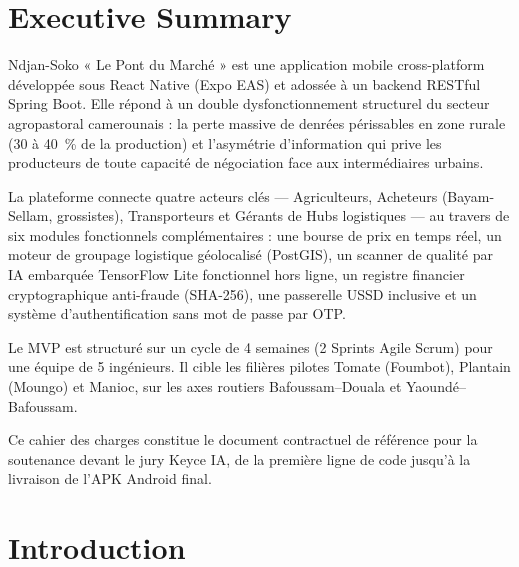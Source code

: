 \documentclass[12pt,a4paper]{report}
\begin{document}
\chapter*{Executive Summary}

Ndjan-Soko « Le Pont du Marché » est une application mobile cross-platform développée sous React Native (Expo EAS) et adossée à un backend RESTful Spring Boot. Elle répond à un double dysfonctionnement structurel du secteur agropastoral camerounais : la perte massive de denrées périssables en zone rurale (30 à 40~\% de la production) et l'asymétrie d'information qui prive les producteurs de toute capacité de négociation face aux intermédiaires urbains.

La plateforme connecte quatre acteurs clés — Agriculteurs, Acheteurs (Bayam-Sellam, grossistes), Transporteurs et Gérants de Hubs logistiques — au travers de six modules fonctionnels complémentaires : une bourse de prix en temps réel, un moteur de groupage logistique géolocalisé (PostGIS), un scanner de qualité par IA embarquée TensorFlow Lite fonctionnel hors ligne, un registre financier cryptographique anti-fraude (SHA-256), une passerelle USSD inclusive et un système d'authentification sans mot de passe par OTP.

Le MVP est structuré sur un cycle de 4 semaines (2 Sprints Agile Scrum) pour une équipe de 5 ingénieurs. Il cible les filières pilotes Tomate (Foumbot), Plantain (Moungo) et Manioc, sur les axes routiers Bafoussam–Douala et Yaoundé–Bafoussam.

Ce cahier des charges constitue le document contractuel de référence pour la soutenance devant le jury Keyce IA, de la première ligne de code jusqu'à la livraison de l'APK Android final.

\tableofcontents
\listoffigures
\listoftables

\clearpage
{}

\chapter*{Introduction}
\end{document}
